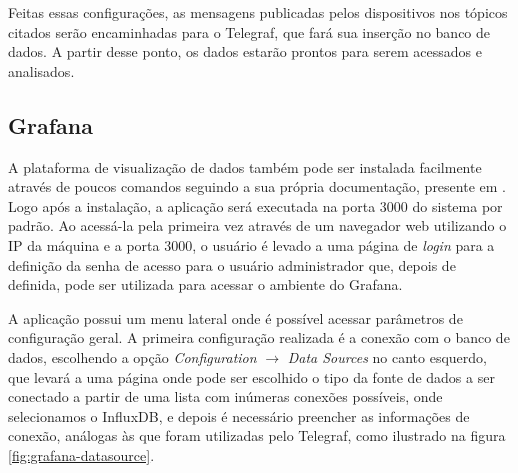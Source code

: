 \documentclass[../monografia.tex]{subfiles}
\begin{document}
Feitas essas configurações, as mensagens publicadas pelos dispositivos nos tópicos citados serão encaminhadas para o Telegraf, que fará sua inserção no banco de dados. A partir desse ponto, os dados estarão prontos para serem acessados e analisados.

\subsection{Grafana}

A plataforma de visualização de dados também pode ser instalada facilmente através de poucos comandos seguindo a sua própria documentação, presente em \cite{grafana-installation}. Logo após a instalação, a aplicação será executada na porta 3000 do sistema por padrão. Ao acessá-la pela primeira vez através de um navegador web utilizando o IP da máquina e a porta 3000, o usuário é levado a uma página de \textit{login} para a definição da senha de acesso para o usuário administrador que, depois de definida, pode ser utilizada para acessar o ambiente do Grafana. 

A aplicação possui um menu lateral onde é possível acessar parâmetros de configuração geral. A primeira configuração realizada é a conexão com o banco de dados, escolhendo a opção \textit{Configuration} $\rightarrow$ \textit{Data Sources} no canto esquerdo, que levará a uma página onde pode ser escolhido o tipo da fonte de dados a ser conectado a partir de uma lista com inúmeras conexões possíveis, onde selecionamos o InfluxDB, e depois é necessário preencher as informações de conexão, análogas às que foram utilizadas pelo Telegraf, como ilustrado na figura \ref{fig:grafana-datasource}.
\end{document}
